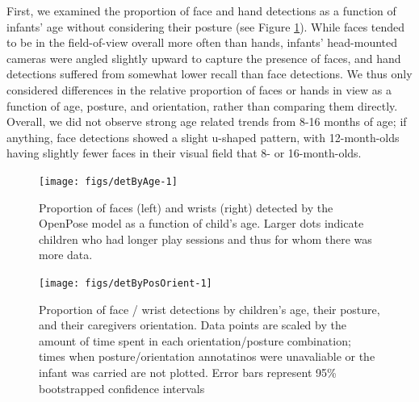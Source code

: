 \documentclass[english,man]{apa6}
\begin{document}
First, we examined the proportion of face and hand detections as a
function of infants' age without considering their posture (see Figure
\ref{fig:detByAge}). While faces tended to be in the field-of-view
overall more often than hands, infants' head-mounted cameras were angled
slightly upward to capture the presence of faces, and hand detections
suffered from somewhat lower recall than face detections. We thus only
considered differences in the relative proportion of faces or hands in
view as a function of age, posture, and orientation, rather than
comparing them directly. Overall, we did not observe strong age related
trends from 8-16 months of age; if anything, face detections showed a
slight u-shaped pattern, with 12-month-olds having slightly fewer faces
in their visual field that 8- or 16-month-olds.

\begin{figure}[H]
\texttt{[image: figs/detByAge-1]} \caption{Proportion of faces (left) and wrists (right) detected by the OpenPose model as a function of child's age. Larger dots indicate children who had longer play sessions and thus for whom there was more data.}\label{fig:detByAge}
\end{figure}

\begin{figure}[H]

{\centering \texttt{[image: figs/detByPosOrient-1]} 

}

\caption{Proportion of face / wrist detections by children's age, their posture, and their caregivers orientation. Data points are scaled by the amount of time spent in each orientation/posture combination; times when posture/orientation annotatinos were unavaliable or the infant was carried are not plotted. Error bars represent 95\% bootstrapped confidence intervals}\label{fig:detByPosOrient}
\end{figure}
\end{document}
